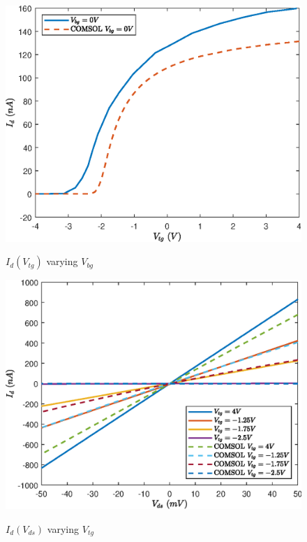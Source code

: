 \documentclass[12pt,a4paper,titlepage]{article}
\begin{document}
\begin{figure}[H]
	\centering
	\includegraphics[width=1\textwidth]{Grafici/Id(Vtg)_HfO2_MoS2_varying_Vbg.eps} 
	\label{fig:Id(Vtg)_HfO2_MoS2_varying_Vbg}
	\caption{$I_d(V_{tg})$ varying $V_{bg}$}
\end{figure}

\begin{figure}[H]
	\centering
	\includegraphics[width=1\textwidth]{Grafici/Id(Vds)_HfO2_MoS2_varying_Vtg.eps} 
	\label{fig:Id(Vds)_HfO2_MoS2_varying_Vtg}
	\caption{$I_d(V_{ds})$ varying $V_{tg}$}
\end{figure} 

\newpage

\nocite{*}
\printbibliography
\end{document}
